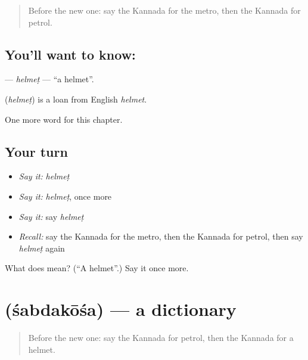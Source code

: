 \label{lesson:KA-C296-helmet}



\begin{quote}
Before the new one: say the Kannada for the metro, then the Kannada for petrol.
\end{quote}

\subsection*{You'll want to know: }
\textbf{} — \emph{helmeṭ} — \textquotedblleft{}a helmet\textquotedblright{}.

\begin{cousinweb}
\textbf{} (\emph{helmeṭ}) is a loan from English \emph{helmet}.
\end{cousinweb}

\begin{grammarlens}[title={What you've built}]
One more word for this chapter.
\end{grammarlens}

\subsection*{Your turn}
\begin{itemize}
\raggedright
  \item \emph{Say it:} \emph{helmeṭ}
  \item \emph{Say it:} \emph{helmeṭ}, once more
  \item \emph{Say it:} say \emph{helmeṭ}
  \item \emph{Recall:} say the Kannada for the metro, then the Kannada for petrol, then say \emph{helmeṭ} again
\end{itemize}

\begin{tcolorbox}[breakable,colback=teal!4,colframe=teal!35!black,title={Before you move on}]
What does  mean? (\textquotedblleft{}A helmet\textquotedblright{}.) Say it once more.
\end{tcolorbox}
\section[\texorpdfstring{\kn{ಶಬ್ದಕೋಶ} (śabdakōśa)}{ಶಬ್ದಕೋಶ (śabdakōśa)}]{ (śabdakōśa) — a dictionary}

\label{lesson:KA-C296-sabdakosa}



\begin{quote}
Before the new one: say the Kannada for petrol, then the Kannada for a helmet.
\end{quote}

